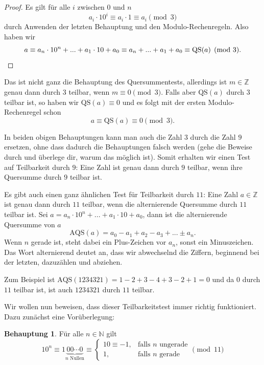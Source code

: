 \documentclass[a4paper,ngerman,12pt]{scrartcl}
\newcommand{\N}{\mathbb{N}}
\newcommand{\Z}{\mathbb{Z}}
\theoremstyle{definition}
\newtheorem{satz}{Behauptung}
\begin{document}
\begin{proof}
  Es gilt für alle $i$ zwischen $0$ und $n$
  \[ a_i \cdot 10^i \equiv a_i \cdot 1 \equiv a_i \pmod{3} \]
  durch Anwenden der letzten Behauptung und den Modulo-Rechenregeln. Also haben wir
  \[ a \equiv a_n \cdot 10^n + ... + a_1 \cdot 10 + a_0 \equiv a_n + ... + a_1 + a_0 \equiv \mathrm{QS}(a) \pmod{3}. \qedhere \]
\end{proof}

Das ist nicht ganz die Behauptung des Quersummentests, allerdings ist $m \in \Z$ genau dann durch $3$ teilbar, wenn $m \equiv 0 \pmod{3}$. Falls aber $\mathrm{QS}(a)$ durch $3$ teilbar ist, so haben wir $\mathrm{QS}(a) \equiv 0$ und es folgt mit der ersten Modulo-Rechenregel schon
\[ a \equiv \mathrm{QS}(a) \equiv 0 \pmod{3}. \]

In beiden obigen Behauptungen kann man auch die Zahl $3$ durch die Zahl $9$ ersetzen, ohne dass dadurch die Behauptungen falsch werden (gehe die Beweise durch und überlege dir, warum das möglich ist). Somit erhalten wir einen Test auf Teilbarkeit durch $9$: Eine Zahl ist genau dann durch $9$ teilbar, wenn ihre Quersumme durch $9$ teilbar ist.

Es gibt auch einen ganz ähnlichen Test für Teilbarkeit durch $11$: Eine Zahl $a \in \Z$ ist genau dann durch $11$ teilbar, wenn die alternierende Quersumme durch $11$ teilbar ist. Sei $a = a_n \cdot 10^n + ... + a_1 \cdot 10 + a_0$, dann ist die alternierende Quersumme von $a$
\[ \mathrm{AQS}(a) = a_0 - a_1 + a_2 - a_3 + ... \pm a_n. \]
Wenn $n$ gerade ist, steht dabei ein Plus-Zeichen vor $a_n$, sonst ein Minuszeichen. Das Wort alternierend deutet an, dass wir abwechselnd die Ziffern, beginnend bei der letzten, dazuzählen und abziehen.

Zum Beispiel ist $\mathrm{AQS}(1234321) = 1 - 2 + 3 - 4 + 3 - 2 + 1 = 0$ und da $0$ durch $11$ teilbar ist, ist auch $1234321$ durch $11$ teilbar.

Wir wollen nun beweisen, dass dieser Teilbarkeitstest immer richtig funktioniert. Dazu zunächst eine Vorüberlegung:

\begin{satz}
  Für alle $n \in \N$ gilt
  \[
    10^n \equiv 1\underbrace{00\cdots0}_{n \text{ Nullen}} \equiv \begin{cases}
      10 \equiv -1, & \text{falls $n$ ungerade}\\
      1, & \text{falls $n$ gerade}
    \end{cases} \pmod{11}
  \]
\end{satz}
\end{document}
